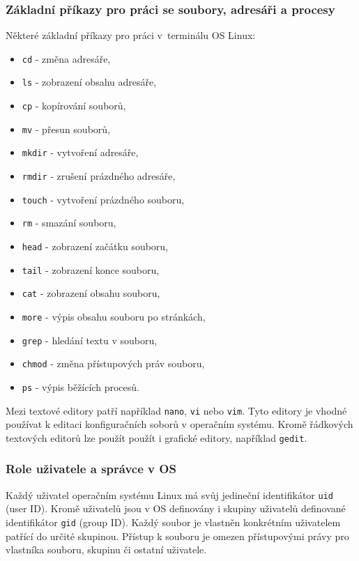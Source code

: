 \subsubsection{Základní příkazy pro práci se soubory, adresáři a procesy}
Některé základní příkazy pro práci v~terminálu OS Linux:
\begin{itemize}
  \item \texttt{cd} - změna adresáře,
  \item \texttt{ls} - zobrazení obsahu adresáře,
  \item \texttt{cp} - kopírování souborů,
  \item \texttt{mv} - přesun souborů,
  \item \texttt{mkdir} - vytvoření adresáře,
  \item \texttt{rmdir} - zrušení prázdného adresáře,
  \item \texttt{touch} - vytvoření prázdného souboru,
  \item \texttt{rm} - smazání souboru,
  \item \texttt{head} - zobrazení začátku souboru,
  \item \texttt{tail} - zobrazení konce souboru,
  \item \texttt{cat} - zobrazení obsahu souboru,
  \item \texttt{more} - výpis obsahu souboru po stránkách,
  \item \texttt{grep} - hledání textu v souboru,
  \item \texttt{chmod} - změna přístupových práv souboru,
  \item \texttt{ps} - výpis běžících procesů.
\end{itemize}

Mezi textové editory patří například \texttt{nano}, {\tt vi} nebo \texttt{vim}. Tyto editory je vhodné používat k editaci konfiguračních soborů v operačním systému. Kromě řádkových textových editorů lze použít použít i grafické editory, například \texttt{gedit}.

\subsubsection{Role uživatele a správce v OS}
Každý uživatel operačním systému Linux má svůj jedineční identifikátor \texttt{uid} (user ID). Kromě uživatelů jsou v OS definovány i skupiny uživatelů definované identifikátor {\tt gid} (group ID). Každý soubor je vlastněn konkrétním uživatelem patřící do určité skupinou. Přístup k souboru je omezen přístupovými právy pro vlastníka souboru, skupinu či ostatní uživatele. 

